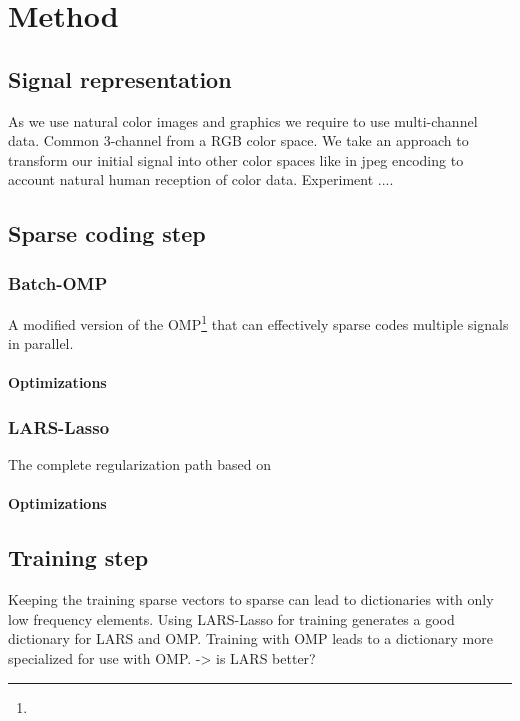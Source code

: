 \chapter{Method}
\thispagestyle{empty}

\section{Signal representation}
As we use natural color images and graphics we require to use multi-channel data. Common 3-channel from a RGB color space.
We take an approach to transform our initial signal into other color spaces like in jpeg encoding to account natural human reception of
color data. 
Experiment ....

\section{Sparse coding step}
\subsection{Batch-OMP}
A modified version of the OMP\footnote{} that can effectively sparse codes multiple signals in parallel.
\cite{Rubinstein2008}
\subsubsection*{Optimizations}

\subsection{LARS-Lasso}
The complete regularization path based on \cite{Efron2004}
\subsubsection*{Optimizations}


\section{Training step}
Keeping the training sparse vectors to sparse can lead to dictionaries with only low frequency elements.
Using LARS-Lasso for training generates a good dictionary for LARS and OMP. Training with OMP leads to 
a dictionary more specialized for use with OMP. -> is LARS better?

